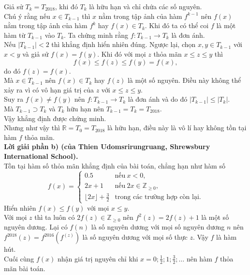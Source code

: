\begin{ex}
{Giả sử $T_k=T_{2018}$, khi đó $T_k$ là hữu hạn và chỉ chứa các số nguyên.\\
Chú ý rằng nếu $x\in T_{k-1}$ thì $x$ nằm trong tập ảnh của hàm $f^{k-1}$ nên $f(x)$ nằm trong tập ảnh của hàm $f^k$ hay $f(x)\in T_k$. Khi đó ta có thể coi $f$ là một hàm từ $T_{k-1}$ vào $T_k$. Ta chứng minh rằng $f:T_{k-1}\rightarrow T_k$ là đơn ánh.\\
Nếu $|T_{k-1}|<2$ thì khẳng định hiển nhiên đúng. Ngược lại, chọn $x,y\in T_{k-1}$ với $x<y$ và giả sử $f(x)=f(y)$. Khi đó với mọi $z$ thỏa mãn $x\le z\le y$ thì $$f(x)\le f(z)\le f(y)=f(x),$$
do đó $f(z)=f(x)$. \\
Mà $x\in T_{k-1}$ nên $f(x)\in T_k$ hay $f(z)$ là một số nguyên. Điều này không thể xảy ra vì có vô hạn giá trị của $z$ với $x\le z\le y$.\\
Suy ra $f(x)\ne f(y)$ nên $f:T_{k-1}\rightarrow T_k$ là đơn ánh và do đó $|T_{k-1}|\le|T_k|$.\\
Mà $T_{k-1}\supset T_k$ và $T_k$ hữu hạn nên $T_{k-1}=T_k=T_{2018}$.\\
Vậy khẳng định được chứng minh.\\
Nhưng như vậy thì $\mathbb{R}=T_0=T_{2018}$ là hữu hạn, điều này là vô lí hay không tồn tại hàm $f$ thỏa mãn.\\
\textbf{Lời giải phần b) (của Thien Udomsrirungruang, Shrewsbury International School).}\\
Tồn tại hàm số thỏa mãn khẳng định của bài toán, chẳng hạn như hàm số
 $$f(x)=
 	\begin{cases}
	 	0.5 & \text{nếu}\ x<0,\\
	 	2x+1 & \text{nếu}\ 2x\in\mathbb{Z}_{\ge 0},\\
	 	\lfloor 2x \rfloor + \frac{3}{2} & \text{trong các trường hợp còn lại}.
	 \end{cases}$$
Hiển nhiên $f(x)\le f(y)$ với mọi $x\le y$.\\
Với mọi $z$ thì ta luôn có $2f(z)\in \mathbb{Z}_{\ge 0}$ nên $f^2(z)=2f(z)+1$ là một số nguyên dương. Lại có $f(n)$ là số nguyên dương với mọi số nguyên dương $n$ nên $f^{2018}(z)=f^{2016}(f^(z))$ là số nguyên dương với mọi số thực $z$. Vậy $f$ là hàm hút.\\
Cuối cùng $f(x)$ nhận giá trị nguyên chỉ khi $x=0;\frac{1}{2};1;\frac{3}{2};\ldots$ nên hàm $f$ thỏa mãn bài toán.    
}
\end{ex}

